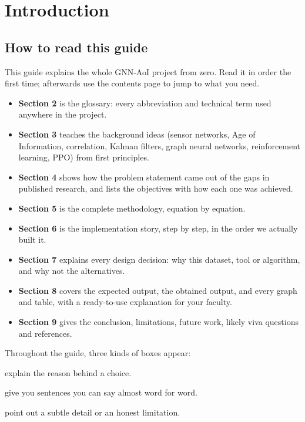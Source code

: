 \section{Introduction}
\subsection{How to read this guide}

This guide explains the whole GNN-AoI project from zero. Read it in order the first time; afterwards use the
contents page to jump to what you need.

\begin{itemize}
  \item \textbf{Section 2} is the glossary: every abbreviation and technical term used anywhere in the project.
  \item \textbf{Section 3} teaches the background ideas (sensor networks, Age of Information, correlation, Kalman
        filters, graph neural networks, reinforcement learning, PPO) from first principles.
  \item \textbf{Section 4} shows how the problem statement came out of the gaps in published research, and lists the
        objectives with how each one was achieved.
  \item \textbf{Section 5} is the complete methodology, equation by equation.
  \item \textbf{Section 6} is the implementation story, step by step, in the order we actually built it.
  \item \textbf{Section 7} explains every design decision: why this dataset, tool or algorithm, and why not the
        alternatives.
  \item \textbf{Section 8} covers the expected output, the obtained output, and every graph and table, with a
        ready-to-use explanation for your faculty.
  \item \textbf{Section 9} gives the conclusion, limitations, future work, likely viva questions and references.
\end{itemize}

Throughout the guide, three kinds of boxes appear:

\begin{whybox}
explain the reason behind a choice.
\end{whybox}
\begin{saybox}
give you sentences you can say almost word for word.
\end{saybox}
\begin{notebox}
point out a subtle detail or an honest limitation.
\end{notebox}

